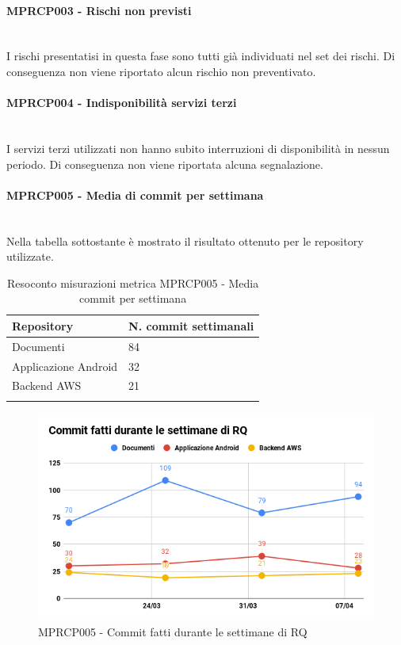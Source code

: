 \paragraph{MPRCP003 - Rischi non previsti}\mbox{}\\[0.4cm]
I rischi presentatisi in questa fase sono tutti già individuati nel set dei rischi. Di conseguenza non viene riportato alcun rischio non preventivato.
\paragraph{MPRCP004 - Indisponibilità servizi terzi}\mbox{}\\[0.4cm]
I servizi terzi utilizzati non hanno subito interruzioni di disponibilità in nessun periodo. Di conseguenza non viene riportata alcuna segnalazione.
\paragraph{MPRCP005 - Media di commit per settimana}\mbox{}\\[0.4cm]
Nella tabella sottostante è mostrato il risultato ottenuto per le repository utilizzate.
\begin{center}%
	\centering
	\renewcommand{\arraystretch}{1.5}
	\begin{longtable}{  p{5cm}  p{5cm} }
		\rowcolor{tableHeadYellow}
		\textbf{Repository}   & \textbf{N. commit settimanali} \\ 
		\endhead
		Documenti    			   & 84 \\
		Applicazione Android  & 32 \\
		Backend AWS    & 21          \\
		\rowcolor{white}
		\caption{Resoconto misurazioni metrica MPRCP005 - Media commit per settimana}
	\end{longtable}
\end{center}
\begin{figure}[H]
	\centering
	\includegraphics[width=13cm,keepaspectratio]{../includes/pics/Commit_RQ.png}
	\caption{\label{fig:mission}MPRCP005 - Commit fatti durante le settimane di RQ}
\end{figure}
